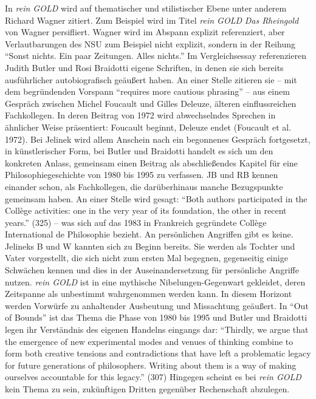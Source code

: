 \documentclass[fontsize=12pt]{scrartcl}
\begin{document}
In \textit{rein GOLD} wird auf thematischer und stilistischer Ebene unter anderem Richard Wagner zitiert. Zum Beispiel wird im Titel \textit{rein GOLD} \textit{Das Rheingold} von Wagner persifliert. Wagner wird im Abspann explizit referenziert, aber Verlautbarungen des NSU zum Beispiel nicht explizit, sondern in der Reihung "`Sonst nichts. Ein paar Zeitungen. Alles nichts."' Im Vergleichsessay referenzieren Judith Butler und Rosi Braidotti eigene Schriften, in denen sie sich bereits ausf\"uhrlicher autobiografisch ge\"au{\ss}ert haben. An einer Stelle zitieren sie -- mit dem begr\"undenden Vorspann "`requires more cautious phrasing"' -- aus einem Gespr\"ach zwischen Michel Foucault und Gilles Deleuze, \"alteren einflussreichen Fachkollegen\textsuperscript{\tiny *}. In deren Beitrag von 1972 wird abwechselndes Sprechen in \"ahnlicher Weise pr\"asentiert: Foucault beginnt, Deleuze endet (Foucault et al. 1972). Bei Jelinek wird allem Anschein nach ein begonnenes Gespr\"ach fort\-ge\-setzt, in k\"unstlerischer Form, bei Butler und Braidotti handelt es sich um den konkreten Anlass, gemeinsam einen Beitrag als abschlie{\ss}endes Kapitel f\"ur eine Philosophiegeschichte von 1980 bis 1995 zu verfassen. JB und RB kennen einander schon, als Fachkollegen\textsuperscript{\tiny *}, die dar\"uberhinaus manche Bezugspunkte gemeinsam haben. An einer Stelle wird gesagt: "`Both authors participated in the Coll\`{e}ge activities: one in the very year of its foundation, the other in recent years."' (325) -- was sich auf das 1983 in Frankreich gegr\"undete Coll\`{e}ge International de Philosophie bezieht. An pers\"onlichen Angriffen gibt es keine. Jelineks B und W kannten sich zu Beginn bereits. Sie werden als Tochter und Vater vorgestellt, die sich nicht zum ersten Mal begegnen, gegenseitig einige Schw\"achen kennen und dies in der Aus\-ein\-andersetzung f\"ur pers\"onliche Angriffe nutzen. \textit{rein GOLD} ist in eine mythische Nibelungen-Gegenwart gekleidet, deren Zeitspanne als unbestimmt wahrgenommen werden kann. In diesem Horizont werden Vorw\"urfe zu anhaltender Ausbeutung und Missachtung ge\"au{\ss}ert. In "`Out of Bounds"' ist das Thema die Phase von 1980 bis 1995 und Butler und Braidotti legen ihr Verst\"andnis des eigenen Handelns eingangs dar: "`Thirdly, we argue that the emergence of new experimental modes and venues of thinking combine to form both creative tensions and contradictions that have left a pro\-ble\-ma\-tic legacy for future generations of philosophers. Writing about them is a way of making ourselves accountable for this legacy."' (307) Hingegen scheint es bei \textit{rein GOLD} kein Thema zu sein, zuk\"unftigen Dritten gegen\"uber Rechenschaft abzulegen.
\end{document}
